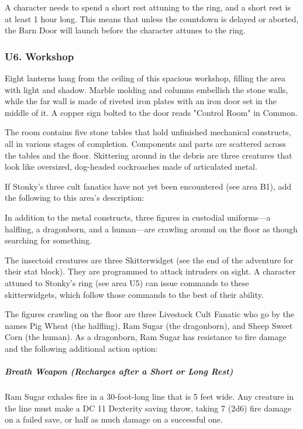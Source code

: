 \documentclass[10pt,a4paper,twoside,bg=print,twocolumn,openany,nodeprecatedcode]{dndbook}
\begin{document}
A character needs to spend a short rest attuning to the ring, and a short rest is at least 1 hour long. This means that unless the countdown is delayed or aborted, the Barn Door will launch before the character attunes to the ring.

\subsubsection{U6. Workshop}
\begin{DndReadAloud}{}
Eight lanterns hang from the ceiling of this spacious workshop, filling the area with light and shadow. Marble molding and columns embellish the stone walls, while the far wall is made of riveted iron plates with an iron door set in the middle of it. A copper sign bolted to the door reads "Control Room" in Common.

The room contains five stone tables that hold unfinished mechanical constructs, all in various stages of completion. Components and parts are scattered across the tables and the floor. Skittering around in the debris are three creatures that look like oversized, dog-headed cockroaches made of articulated metal.

\end{DndReadAloud}

If Stonky's three cult fanatics have not yet been encountered (see area B1), add the following to this area's description:

\begin{DndReadAloud}{}
In addition to the metal constructs, three figures in custodial uniforms—a halfling, a dragonborn, and a human—are crawling around on the floor as though searching for something.

\end{DndReadAloud}

The insectoid creatures are three Skitterwidget (see the end of the adventure for their stat block). They are programmed to attack intruders on sight. A character attuned to Stonky's ring (see area U5) can issue commands to these skitterwidgets, which follow those commands to the best of their ability.

The figures crawling on the floor are three Livestock Cult Fanatic who go by the names Pig Wheat (the halfling), Ram Sugar (the dragonborn), and Sheep Sweet Corn (the human). As a dragonborn, Ram Sugar has resistance to fire damage and the following additional action option:

\begin{DndSidebar}[float=!b]{}
\subparagraph{Breath Weapon (Recharges after a Short or Long Rest)}
Ram Sugar exhales fire in a 30-foot-long line that is 5 feet wide. Any creature in the line must make a DC 11 Dexterity saving throw, taking 7 (2d6) fire damage on a failed save, or half as much damage on a successful one.



\end{DndSidebar}
\end{document}
